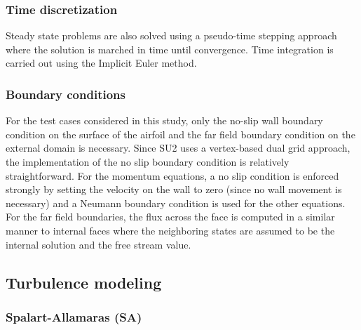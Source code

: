 \subsubsection{Time discretization}\label{ssec:timedisc}
\noindent Steady state problems are also solved using a pseudo-time stepping approach where the solution is marched in time until convergence. Time integration is carried out using the Implicit Euler method. 


 \subsubsection{Boundary conditions}
For the test cases considered in this study, only the no-slip wall boundary condition on the surface of the airfoil and the far field boundary condition on the external domain is necessary. Since SU2 uses a vertex-based dual grid approach, the implementation of the no slip boundary condition is relatively straightforward. For the momentum equations, a no slip condition is enforced strongly by setting the velocity on the wall to zero (since no wall movement is necessary) and a Neumann boundary condition is used for the other equations. For the far field boundaries, the flux across the face is computed in a similar manner to internal faces where the neighboring states are assumed to be the internal solution and the free stream value. 

\subsection{Turbulence modeling}

\subsubsection{Spalart-Allamaras (SA)}

